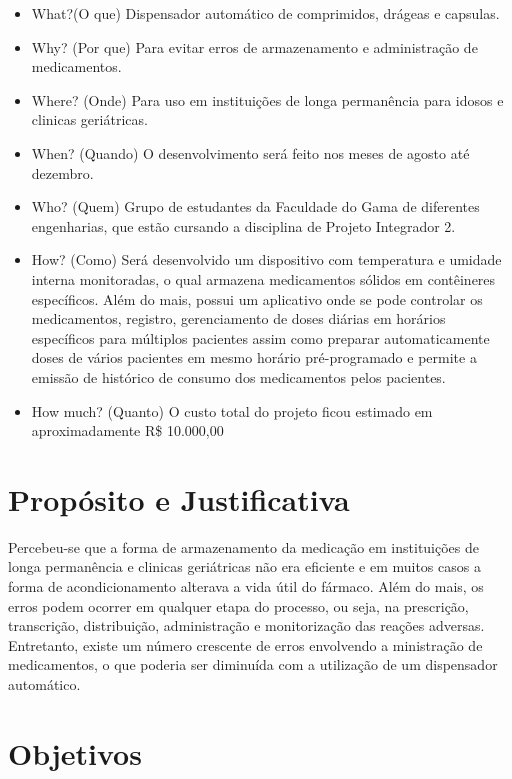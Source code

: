 \begin{apendicesenv}
\begin{itemize}
\item What?(O que) Dispensador automático de comprimidos, drágeas e capsulas.
\item Why? (Por que) Para evitar erros de armazenamento e administração de medicamentos.
\item Where? (Onde) Para uso em instituições de longa permanência para idosos e clinicas geriátricas.
\item When? (Quando) O desenvolvimento será feito nos meses de agosto até dezembro.
\item Who? (Quem) Grupo de estudantes da Faculdade do Gama de diferentes engenharias, que estão cursando a disciplina de Projeto Integrador 2.
\item How? (Como) Será desenvolvido um dispositivo com temperatura e umidade interna monitoradas, o qual armazena medicamentos sólidos em contêineres específicos. Além do mais, possui um aplicativo onde se pode controlar os medicamentos, registro, gerenciamento de doses diárias em horários específicos para múltiplos pacientes assim como preparar automaticamente doses de vários pacientes em mesmo horário pré-programado e permite a emissão de histórico de consumo dos medicamentos pelos pacientes.


\item How much? (Quanto) O custo total do projeto ficou estimado em aproximadamente R\$ 10.000,00
\end{itemize}

\section{Propósito e Justificativa}

Percebeu-se que a forma de armazenamento da medicação em instituições de longa permanência e clinicas geriátricas não era eficiente e em muitos casos a forma de acondicionamento alterava a vida útil do fármaco. Além do mais, os erros podem ocorrer em qualquer etapa do processo, ou seja, na prescrição, transcrição, distribuição, administração e monitorização das reações adversas. Entretanto, existe um número crescente de erros envolvendo a ministração de medicamentos, o que poderia ser diminuída com a utilização de um dispensador automático.

\section{Objetivos}


\end{apendicesenv}
